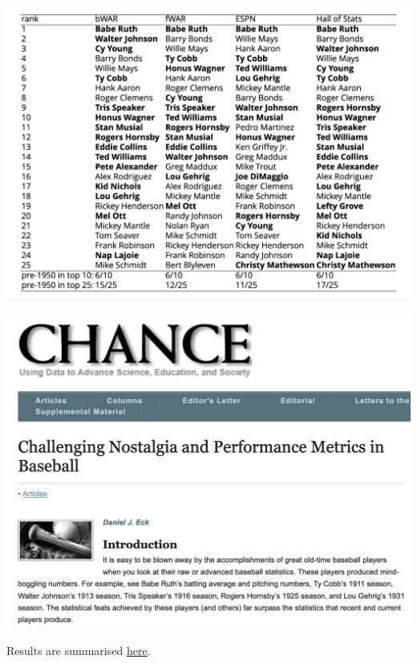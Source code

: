 \documentclass[
  ignorenonframetext,
]{beamer}
\begin{document}
\begin{frame}{}
\protect\hypertarget{section-1}{}
\includegraphics{rankings.png}
\end{frame}

\begin{frame}{}
\protect\hypertarget{section-2}{}
\includegraphics{Chance.png}

Results are summarised
\href{https://deck13.shinyapps.io/challenging_baseball_nostalgia/}{here}.
\end{frame}
\end{document}
